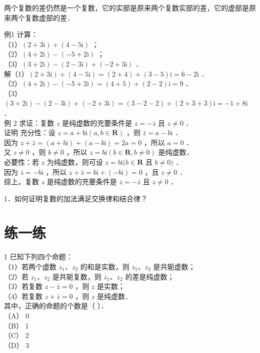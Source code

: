\documentclass[10pt]{article}
\begin{document}
两个复数的差仍然是一个复数，它的实部是原来两个复数实部的差，它的虚部是原来两个复数虚部的差．

例1 计算：\\
（1）\((2+3 \mathrm{i})+(4-5 \mathrm{i})\) ；\\
（2）\((4+2 \mathrm{i})-(-5+2 \mathrm{i})\) ；\\
（3）\((3+2 \mathrm{i})-(2-3 \mathrm{i})+(-2+3 \mathrm{i})\) ．\\
解（1）\((2+3 \mathrm{i})+(4-5 \mathrm{i})=(2+4)+(3-5) \mathrm{i}=6-2 \mathrm{i}\) ．\\
（2）\((4+2 \mathrm{i})-(-5+2 \mathrm{i})=(4+5)+(2-2) \mathrm{i}=9\) ．\\
（3）\((3+2 \mathrm{i})-(2-3 \mathrm{i})+(-2+3 \mathrm{i})=(3-2-2)+(2+3+3) \mathrm{i}=-1+8 \mathrm{i}\) ．\\
例 2 求证：复数 \(z\) 是纯虚数的充要条件是 \(z=-\bar{z}\) 且 \(z \neq 0\) ．\\
证明 充分性：设 \(z=a+b \mathrm{i}(a, b \in \mathbf{R})\) ，则 \(\bar{z}=a-b \mathrm{i}\) ．\\
因为 \(z+\bar{z}=(a+b \mathrm{i})+(a-b \mathrm{i})=2 a=0\) ，所以 \(a=0\) ．\\
又 \(z \neq 0\) ，则 \(b \neq 0\) ，所以 \(z=b \mathrm{i}(b \in \mathbf{R}, b \neq 0)\) 是纯虚数．\\
必要性：若 \(z\) 为纯虚数，则可设 \(z=b \mathrm{i}(b \in \mathbf{R}\) 且 \(b \neq 0)\) ．\\
因为 \(\bar{z}=-b \mathrm{i}\) ，所以 \(z+\bar{z}=b \mathrm{i}+(-b \mathrm{i})=0\) ，且 \(z \neq 0\) ．\\
综上，复数 \(z\) 是纯虚数的充要条件是 \(z=-\bar{z}\) 且 \(z \neq 0\) ．

1．如何证明复数的加法满足交换律和结合律？

\section*{练一练}
1 已知下列四个命题：\\
（1）若两个虚数 \(z_{1} 、 z_{2}\) 的和是实数，则 \(z_{1} 、 z_{2}\) 是共轭虚数；\\
（2）若 \(z_{1} 、 z_{2}\) 是共轭复数，则 \(z_{1} 、 z_{2}\) 的差是纯虚数；\\
（3）若复数 \(z-\bar{z}=0\) ，则 \(z\) 是实数；\\
（4）若复数 \(z+\bar{z}=0\) ，则 \(z\) 是纯虚数．\\
其中，正确的命题的个数是（ ）．\\
（A） 0\\
（B） 1\\
（C） 2\\
（D） 3
\end{document}

